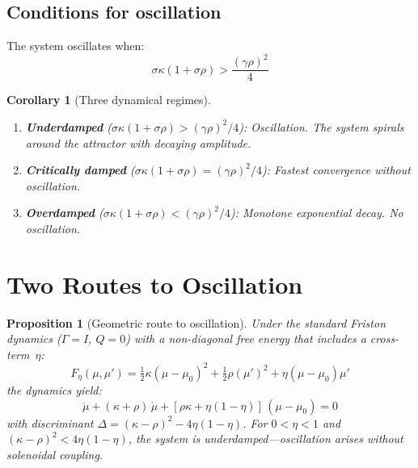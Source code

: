 \documentclass[11pt,a4paper]{article}
\newtheorem{proposition}[theorem]{Proposition}
\newtheorem{corollary}[theorem]{Corollary}
\begin{document}
\subsection{Conditions for oscillation}

The system oscillates when:
\begin{equation}
\sigma\kappa(1 + \sigma\rho) > \frac{(\gamma\rho)^2}{4}
\end{equation}

\begin{corollary}[Three dynamical regimes]
\label{cor:regimes}
\leavevmode
\begin{enumerate}[nosep]
\item \textbf{Underdamped}
  ($\sigma\kappa(1{+}\sigma\rho) > (\gamma\rho)^2/4$):
  Oscillation. The system spirals around the attractor with decaying
  amplitude.
\item \textbf{Critically damped}
  ($\sigma\kappa(1{+}\sigma\rho) = (\gamma\rho)^2/4$):
  Fastest convergence without oscillation.
\item \textbf{Overdamped}
  ($\sigma\kappa(1{+}\sigma\rho) < (\gamma\rho)^2/4$):
  Monotone exponential decay. No oscillation.
\end{enumerate}
\end{corollary}

\section{Two Routes to Oscillation}
\label{sec:two-routes}

\begin{proposition}[Geometric route to oscillation]
\label{prop:geometric}
Under the standard Friston dynamics ($\Gamma = I$, $Q = 0$) with a
\emph{non-diagonal} free energy that includes a cross-term~$\eta$:
\begin{equation}
\label{eq:F-eta}
F_\eta(\mu, \mu') = \tfrac{1}{2}\kappa(\mu - \mu_0)^2
  + \tfrac{1}{2}\rho(\mu')^2 + \eta(\mu - \mu_0)\mu'
\end{equation}
the dynamics yield:
\begin{equation}
\label{eq:dho-eta}
\ddot{\mu} + (\kappa + \rho)\,\dot{\mu}
  + [\rho\kappa + \eta(1-\eta)]\,(\mu - \mu_0) = 0
\end{equation}
with discriminant
$\Delta = (\kappa - \rho)^2 - 4\eta(1-\eta)$.
For $0 < \eta < 1$ and $(\kappa - \rho)^2 < 4\eta(1-\eta)$, the system
is underdamped---oscillation arises \emph{without} solenoidal coupling.
\end{proposition}
\end{document}
